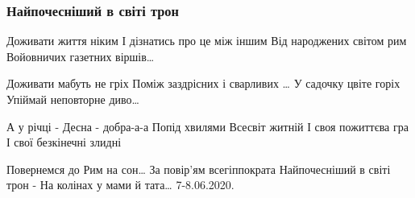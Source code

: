  
 
 

\subsubsection{Найпочесніший в світі трон}
\label{sec:poetry.rus.mykola_dudar_1950.tron}

Доживати життя ніким
І дізнатись про це між іншим
Від народжених світом рим
Войовничих газетних віршів…

Доживати мабуть не гріх
Поміж заздрісних і сварливих
… У садочку цвіте горіх
Упіймай неповторне диво…

А у річці - Десна - добра-а-а
Попід хвилями Всесвіт житній
І своя пожиттєва гра
І свої безкінечні злидні

Повернемся до Рим на сон…
За повір’ям всегіппократа
Найпочесніший в світі трон -
На колінах у мами й тата…
7-8.06.2020. 
